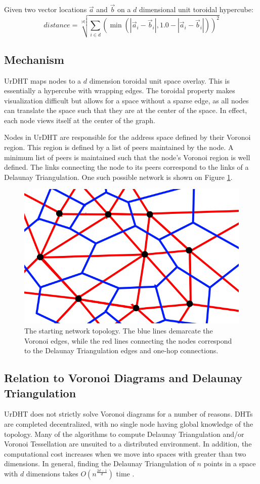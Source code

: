 Given two vector locations $\vec{a}$ and $\vec{b}$ on a  $d$ dimensional unit toroidal hypercube:
\[ distance = \sqrt[|d|]{\sum\limits_{i\in d} (\min(|\vec{a}_i-\vec{b}_i|,1.0-|\vec{a}_i-\vec{b}_i|))^2}\]

\subsection{Mechanism}
UrDHT maps nodes to a $d$ dimension toroidal unit space overlay. This is essentially a hypercube with wrapping edges. The toroidal property makes visualization difficult but allows for a space without a sparse edge, as all nodes can translate the space such that they are at the center of the space.  In effect, each node views itself at the center of the graph.

Nodes in UrDHT are responsible for the address space defined by their Voronoi region. This region is defined by a list of peers maintained by the node. A minimum list of peers is maintained such that the node's Voronoi region is well defined. The links connecting the node to its peers correspond to the links of a Delaunay Triangulation.  One such possible network is shown on Figure \ref{fig:churninit}.


\begin{figure}
	\centering
	\includegraphics[width=0.5\linewidth]{figs/voronoi-churn2}
	\caption[The starting network topology]{The starting network topology.  The blue lines demarcate  the Voronoi edges, while the red lines connecting the nodes correspond to the Delaunay Triangulation edges and one-hop connections.}
	\label{fig:churninit}
\end{figure}

\subsection{Relation to Voronoi Diagrams and Delaunay Triangulation}

UrDHT does not strictly solve Voronoi diagrams \cite{voronoi} for a number of reasons. 
DHTs are completed decentralized, with no single node having global knowledge of the topology.
Many of the algorithms to compute Delaunay Triangulation and/or Voronoi Tessellation are unsuited to a distributed environment.
In addition, the computational cost increases when we move into spaces with greater than two dimensions.
In general, finding the Delaunay Triangulation of $n$ points in a space with $d$ dimensions takes $O(n^{\frac{2d-1}{d}})$ time \cite{watson1981computing}.

